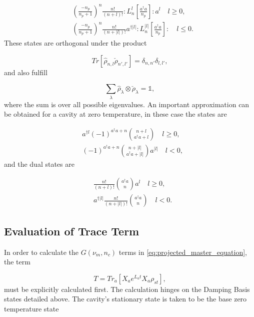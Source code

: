 \documentclass[reprint, amsmath,amssymb, aps,pra]{revtex4-1}
\begin{document}
\begin{align}\label{DefDBDual}
&(\frac{-n_p}{n_p+1})^n\frac{n!}{(n+l)!}:L_n^l[\frac{a^\dagger a}{n_p}]:a^{l}\quad l \geq 0, \\
&(\frac{-n_p}{n_p+1})^n\frac{n!}{(n+|l|)!}a^{\dagger|l|}:L_n^{|l|}[\frac{a^\dagger a}{n_p}]:\quad l \leq 0.
\end{align} These states are orthogonal under the product

\begin{equation}
Tr[\hat{\rho}_{n,l}\check{\rho}_{n',l'}] = \delta_{n,n'}\delta_{l,l'},
\end{equation} and also fulfill

\begin{equation}\label{DampingBasisCompleteness}
\sum_{\lambda} \hat{\rho}_\lambda \otimes \check{\rho}_\lambda = \mathbb{1},
\end{equation} where the sum is over all possible eigenvalues. An important approximation can be obtained for a cavity at zero temperature, in these case the states are \cite{EnglertDB}

\begin{align}\label{DefDBZero}
&a^{\dagger l}(-1)^{a^\dagger a + n}\binom{n+l}{a^\dagger a+l} \quad l \geq 0, \\
&(-1)^{a^\dagger a + n}\binom{n+|l|}{a^\dagger a+|l|}a^{|l|} \quad l < 0,
\end{align} and the dual states are

\begin{align}\label{DefDBDualZero}
&\frac{n!}{(n+l)!}\binom{a^\dagger a}{n}a^l \quad l \geq 0, \\
&a^{\dagger|l|}\frac{n!}{(n+|l|)!}\binom{a^\dagger a}{n} \quad l < 0.
\end{align}

\subsection{Evaluation of Trace Term}\label{TraceAppendix}

In order to calculate the $G(\nu_m,n_c)$ terms in \eqref{eq:projected_master_equation}, the term

\begin{equation}\label{CoolingTrace}
T=Tr_a[X_ae^{L_at}X_a\rho_{st}],
\end{equation} must be explicitly calculated first. The calculation hinges on the Damping Basis states detailed above. The cavity's stationary state is taken to be the base zero temperature state
\end{document}
